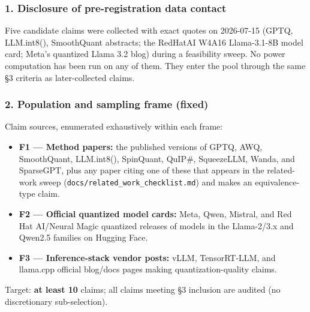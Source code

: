 \subsubsection{1. Disclosure of pre-registration data contact}
Five candidate claims were collected with exact quotes on 2026-07-15 (GPTQ, LLM.int8(), SmoothQuant abstracts; the RedHatAI W4A16 Llama-3.1-8B model card; Meta's quantized Llama 3.2 blog) during a feasibility sweep. No power computation has been run on any of them. They enter the pool through the same \S{}3 criteria as later-collected claims.

\subsubsection{2. Population and sampling frame (fixed)}
Claim sources, enumerated exhaustively within each frame:

\begin{itemize}
\item \textbf{F1 --- Method papers:} the published versions of GPTQ, AWQ, SmoothQuant, LLM.int8(), SpinQuant, QuIP\#, SqueezeLLM, Wanda, and SparseGPT, plus any paper citing one of these that appears in the related-work sweep (\texttt{docs/\allowbreak{}related\_work\_checklist.md}) and makes an equivalence-type claim.
\item \textbf{F2 --- Official quantized model cards:} Meta, Qwen, Mistral, and Red Hat AI/Neural Magic quantized releases of models in the Llama-2/3.x and Qwen2.5 families on Hugging Face.
\item \textbf{F3 --- Inference-stack vendor posts:} vLLM, TensorRT-LLM, and llama.cpp official blog/docs pages making quantization-quality claims.
\end{itemize}
Target: \textbf{at least 10} claims; all claims meeting \S{}3 inclusion are audited (no discretionary sub-selection).

